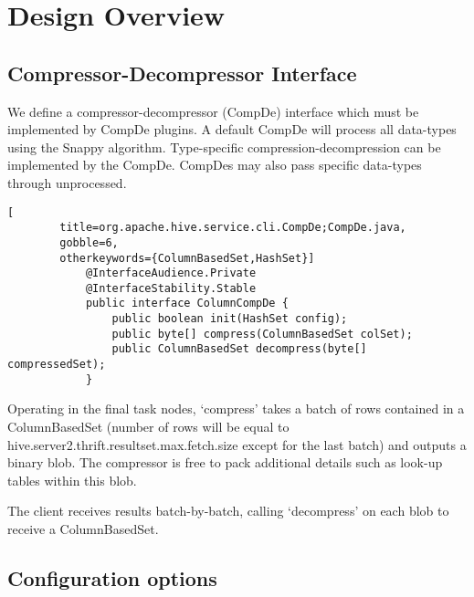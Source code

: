 \documentclass[11pt,a4paper]{article}
\begin{document}
\section{Design Overview}

	\subsection{Compressor-Decompressor Interface}
		
		We define a compressor-decompressor (CompDe) interface which must be implemented by CompDe plugins.
		A default CompDe will process all data-types using the Snappy algorithm.
		Type-specific compression-decompression can be implemented by the CompDe.
		CompDes may also pass specific data-types through unprocessed.
		
		\begin{lstlisting}[
		title=org.apache.hive.service.cli.CompDe;CompDe.java,
		gobble=6,
		otherkeywords={ColumnBasedSet,HashSet}]
			@InterfaceAudience.Private
			@InterfaceStability.Stable
			public interface ColumnCompDe {
				public boolean init(HashSet config);
				public byte[] compress(ColumnBasedSet colSet);
				public ColumnBasedSet decompress(byte[] compressedSet);
			}
		\end{lstlisting}
		
		Operating in the final task nodes, `compress' takes a batch of rows contained in a ColumnBasedSet (number of rows will be equal to \linebreak hive.server2.thrift.resultset.max.fetch.size except for the last batch) and outputs a binary blob.
		The compressor is free to pack additional details such as look-up tables within this blob.
		
		The client receives results batch-by-batch, calling `decompress' on each blob to receive a ColumnBasedSet.
		
	\subsection{Configuration options}
		
\end{document}
